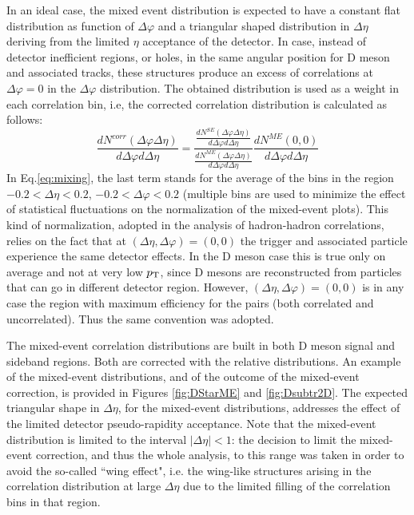 In an ideal case, the mixed event distribution is expected to have a constant flat distribution as function of $\Delta\varphi$ and a triangular shaped distribution in $\Delta\eta$
deriving from the limited $\eta$ acceptance of the detector. In case, instead of detector inefficient regions, or holes, in the same angular position for D meson and associated tracks, these structures produce an excess of correlations at $\Delta\varphi=0$ in the $\Delta\varphi$ distribution. The obtained distribution is used as a weight in each correlation bin, i.e, the corrected correlation distribution is calculated as follows:
\begin{equation}
\label{eq:mixing}
\frac{dN^{corr}\left(\Delta\varphi \Delta\eta\right)}{d\Delta\varphi d\Delta\eta} = \frac{\frac{dN^{SE}\left(\Delta\varphi \Delta\eta\right)}{d\Delta\varphi d\Delta\eta} }{\frac{dN^{ME}\left(\Delta\varphi \Delta\eta\right)}{d\Delta\varphi d\Delta\eta} }\frac{dN^{ME}\left(0,  0\right)}{d\Delta\varphi d\Delta\eta}
\end{equation}
In Eq.\ref{eq:mixing}, the last term stands for the average of the bins in the region $-0.2 < \Delta\eta < 0.2$, $-0.2 < \Delta\varphi < 0.2$ (multiple bins are used to minimize the effect of statistical fluctuations on the normalization of the mixed-event plots).
This kind of normalization, adopted in the analysis of hadron-hadron correlations, relies on the fact that at $(\Delta\eta,\Delta\varphi)=(0,0)$ the trigger and associated particle experience the same detector effects. In the D meson case this is true only on average and not at very low $p_{\rm T}$, since D mesons are reconstructed from particles that can go
in different detector region. However, $(\Delta\eta,\Delta\varphi)=(0,0)$ is in any case
the region with maximum efficiency for the pairs (both correlated and uncorrelated). Thus the same convention was adopted.

The mixed-event correlation distributions are built in both D meson signal and sideband regions. Both are
corrected with the relative distributions. An example of the mixed-event distributions, and of the outcome of the mixed-event correction, is provided in Figures \ref{fig:DStarME} and \ref{fig:Dsubtr2D}. The expected triangular shape in $\Delta\eta$, for the mixed-event distributions, addresses the effect of the limited detector pseudo-rapidity acceptance. Note that the mixed-event distribution is limited to the interval $\left|\Delta\eta\right|<1$: the decision to limit the mixed-event correction, and thus the whole analysis, to this range was taken in order to avoid the so-called ``wing effect", i.e. the wing-like structures arising in the correlation distribution at large $\Delta\eta$ due to the limited filling of the correlation bins in that region. %

